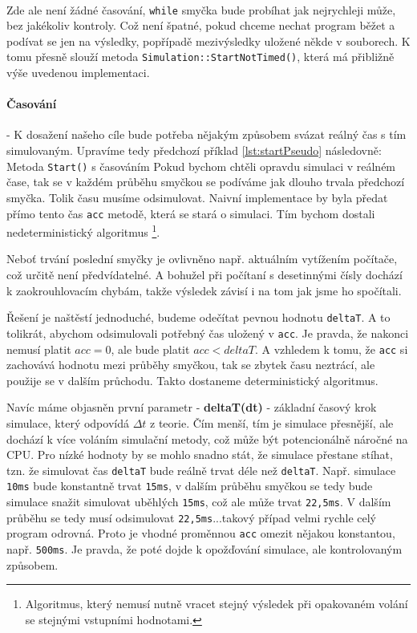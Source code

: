 \paragraph{}
Zde ale není žádné časování, \texttt{while} smyčka bude probíhat jak nejrychleji může, bez jakékoliv kontroly. Což není špatné, pokud chceme nechat program běžet a podívat se jen na výsledky, popřípadě mezivýsledky uložené někde v souborech. K tomu přesně slouží metoda \texttt{Simulation::StartNotTimed()}, která má přibližně výše uvedenou implementaci. 
\paragraph{Časování}
- K dosažení našeho cíle bude potřeba nějakým způsobem svázat reálný čas s tím simulovaným. Upravíme tedy předchozí příklad \ref{lst:startPseudo} následovně:
{Metoda \texttt{Start()} s časováním}
Pokud bychom chtěli opravdu simulaci v reálném čase, tak se v každém průběhu smyčkou se podíváme jak dlouho trvala předchozí smyčka. Tolik času musíme odsimulovat. Naivní implementace by byla předat přímo tento čas \texttt{acc} metodě, která se stará o simulaci. Tím bychom dostali nedeterministický algoritmus
\footnote{Algoritmus, který nemusí nutně vracet stejný výsledek při opakovaném volání se stejnými vstupními hodnotami.}.

Neboť trvání poslední smyčky je ovlivněno např. aktuálním vytížením počítače, což určitě není předvídatelné. A bohužel při počítaní s desetinnými čísly dochází k zaokrouhlovacím chybám, takže výsledek závisí i na tom jak jsme ho spočítali.

Řešení je naštěstí jednoduché, budeme odečítat pevnou hodnotu \texttt{deltaT}.
A to tolikrát, abychom odsimulovali potřebný čas uložený v \texttt{acc}. Je pravda,
že nakonci nemusí platit $ acc=0 $, ale bude platit $ acc<deltaT $. A vzhledem k tomu, že \texttt{acc} si zachovává hodnotu mezi průběhy smyčkou, tak se zbytek času neztrácí, ale použije se v dalším průchodu. Takto dostaneme deterministický algoritmus.

\label{par:spiral}
Navíc máme objasněn první parametr - \textbf{deltaT(dt)} - základní časový krok simulace, který odpovídá $ \Delta t $ z teorie. Čím menší, tím je simulace přesnější, ale dochází k více voláním simulační metody, což může být potencionálně náročné na CPU.
Pro nízké hodnoty by se mohlo snadno stát, že simulace přestane stíhat, tzn. že simulovat čas \texttt{deltaT} bude reálně trvat déle než \texttt{deltaT}. Např.
simulace \texttt{10ms} bude konstantně trvat \texttt{15ms}, v dalším průběhu smyčkou se tedy bude simulace snažit simulovat uběhlých \texttt{15ms}, což ale může trvat \texttt{22,5ms}. V dalším průběhu se tedy musí odsimulovat \texttt{22,5ms}...takový případ velmi rychle celý program odrovná. Proto je vhodné proměnnou \texttt{acc} omezit nějakou konstantou, např. \texttt{500ms}. Je pravda, že poté dojde k opožďování simulace, ale kontrolovaným způsobem.
